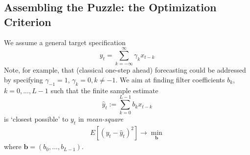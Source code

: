 \documentclass[a4paper]{book}
\begin{document}
\subsection{Assembling the Puzzle: the Optimization Criterion}


We assume a general target specification
\begin{equation}\label{target}
y_t=\sum_{k=-\infty}^{\infty}\gamma_{k} x_{t-k}
\end{equation}
Note, for example, that (classical one-step ahead) forecasting could be addressed by specifying $\gamma_{-1}=1$, $\gamma_k=0, k\neq -1$. We aim at finding filter coefficients $b_{k}$, $k=0,...,L-1$ such that the finite sample
estimate
\begin{equation}\label{filter}
\hat{y}_{t}:=\sum_{k=0}^{L-1}b_{k}x_{t-k}
\end{equation}
is `closest possible' to $y_{t}$ in \emph{mean-square}
\begin{eqnarray}\label{mso}
E\left[(y_{t}-\hat{y}_{t})^2\right]\to\min_{\mathbf{b}}
\end{eqnarray}
where $\mathbf{b}=(b_{0},...,b_{L-1})$.\\
\end{document}
